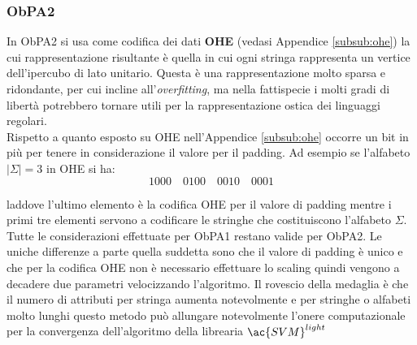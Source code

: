 \subsubsection{ObPA2}
In \ac{ObPA}2 si usa come codifica dei dati \textbf{OHE} (vedasi Appendice \ref{subsub:ohe}) la cui rappresentazione risultante è quella in cui ogni stringa rappresenta un vertice dell'ipercubo di lato unitario. Questa è una rappresentazione molto sparsa e ridondante, per cui incline all'\textit{overfitting}, ma nella fattispecie i molti gradi di libertà potrebbero tornare utili per la rappresentazione ostica dei linguaggi regolari.\\
Rispetto a quanto esposto su OHE nell'Appendice \ref{subsub:ohe} occorre un bit in più per tenere in considerazione il valore per il padding. Ad esempio se l'alfabeto $|\Sigma|=3$ in OHE si ha:
\begin{equation*}
1000 \quad 0100 \quad 0010 \quad 0001
\end{equation*} 

laddove l'ultimo elemento è la codifica OHE per il valore di padding mentre i primi tre elementi servono a codificare le stringhe che costituiscono l'alfabeto $\Sigma$.\\
Tutte le considerazioni effettuate per \ac{ObPA}1 restano valide per \ac{ObPA}2. Le uniche differenze a parte quella suddetta sono che il valore di padding è unico e che per la codifica OHE non è necessario effettuare lo scaling quindi vengono a decadere due parametri velocizzando l'algoritmo. Il rovescio della medaglia è che il numero di attributi per stringa aumenta notevolmente e per stringhe o alfabeti molto lunghi questo metodo può allungare notevolmente l'onere computazionale per la convergenza dell'algoritmo  della librearia $\ac{SVM}^{light}$  

